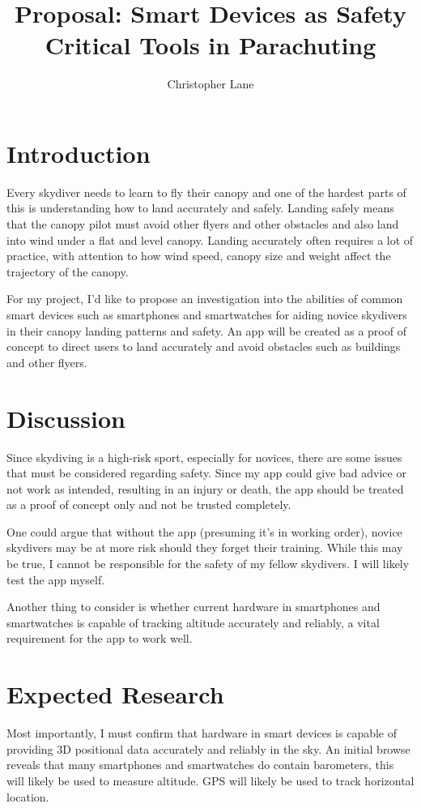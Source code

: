 \documentclass{article}
\title{Proposal: Smart Devices as Safety Critical Tools in Parachuting}
\author{Christopher Lane}
\begin{document}
\maketitle

\section{Introduction}
Every skydiver needs to learn to fly their canopy and one of the hardest parts of this is understanding how to land accurately and safely. Landing safely means that the canopy pilot must avoid other flyers and other obstacles and also land into wind under a flat and level canopy. Landing accurately often requires a lot of practice, with attention to how wind speed, canopy size and weight affect the trajectory of the canopy.

For my project, I'd like to propose an investigation into the abilities of common smart devices such as smartphones and smartwatches for aiding novice skydivers in their canopy landing patterns and safety. An app will be created as a proof of concept to direct users to land accurately and avoid obstacles such as buildings and other flyers.

\section{Discussion}
Since skydiving is a high-risk sport, especially for novices, there are some issues that must be considered regarding safety. Since my app could give bad advice or not work as intended, resulting in an injury or death, the app should be treated as a proof of concept only and not be trusted completely.

One could argue that without the app (presuming it's in working order), novice skydivers may be at more risk should they forget their training. While this may be true, I cannot be responsible for the safety of my fellow skydivers. I will likely test the app myself.

Another thing to consider is whether current hardware in smartphones and smartwatches is capable of tracking altitude accurately and reliably, a vital requirement for the app to work well.

\newpage\section{Expected Research}

Most importantly, I must confirm that hardware in smart devices is capable of providing 3D positional data accurately and reliably in the sky. An initial browse reveals that many smartphones and smartwatches do contain barometers, this will likely be used to measure altitude. GPS will likely be used to track horizontal location.
\end{document}
